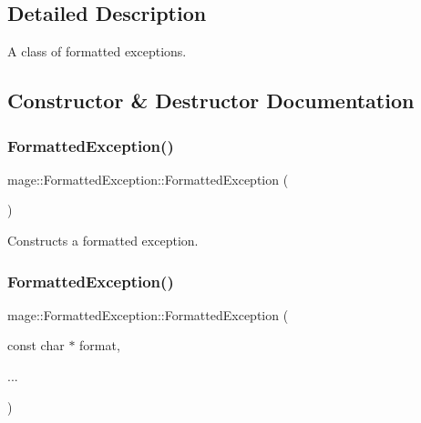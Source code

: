 \subsection{Detailed Description}
A class of formatted exceptions. 

\subsection{Constructor \& Destructor Documentation}
\hypertarget{structmage_1_1_formatted_exception_a77b82a969ec33a3aacec74a5adc4ab8b}{}\label{structmage_1_1_formatted_exception_a77b82a969ec33a3aacec74a5adc4ab8b} 
\subsubsection{\texorpdfstring{Formatted\+Exception()}{FormattedException()}\hspace{0.1cm}{\footnotesize\ttfamily [1/5]}}
{\footnotesize\ttfamily mage\+::\+Formatted\+Exception\+::\+Formatted\+Exception (\begin{DoxyParamCaption}{ }\end{DoxyParamCaption})}

Constructs a formatted exception. \hypertarget{structmage_1_1_formatted_exception_a3fe833a49052a2db99c023b1b1d43621}{}\label{structmage_1_1_formatted_exception_a3fe833a49052a2db99c023b1b1d43621} 
\subsubsection{\texorpdfstring{Formatted\+Exception()}{FormattedException()}\hspace{0.1cm}{\footnotesize\ttfamily [2/5]}}
{\footnotesize\ttfamily mage\+::\+Formatted\+Exception\+::\+Formatted\+Exception (\begin{DoxyParamCaption}\item[{const char $\ast$}]{format,  }\item[{}]{... }\end{DoxyParamCaption})\hspace{0.3cm}{\ttfamily [explicit]}}

